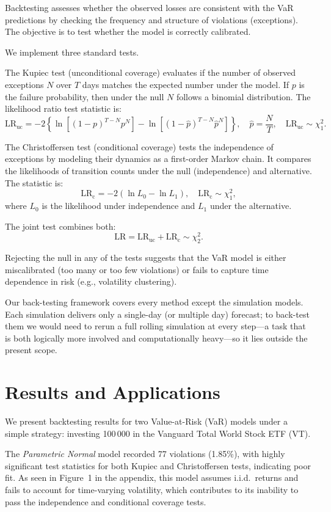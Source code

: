 \documentclass{article}
\begin{document}
Backtesting assesses whether the observed losses are consistent with the VaR predictions by checking the frequency and structure of violations (exceptions). The objective is to test whether the model is correctly calibrated.

We implement three standard tests.

The Kupiec test (unconditional coverage) evaluates if the number of observed exceptions $N$ over $T$ days matches the expected number under the model. If $p$ is the failure probability, then under the null $N$ follows a binomial distribution. The likelihood ratio test statistic is:
\[
\text{LR}_{\text{uc}} = -2 \left\{ \ln\left[(1 - p)^{T - N} p^N \right] - \ln\left[(1 - \hat{p})^{T - N} \hat{p}^N \right] \right\}, \quad \hat{p} = \frac{N}{T}, \quad \text{LR}_{\text{uc}} \sim \chi^2_1.
\]

The Christoffersen test (conditional coverage) tests the independence of exceptions by modeling their dynamics as a first-order Markov chain. It compares the likelihoods of transition counts under the null (independence) and alternative. The statistic is:
\[
\text{LR}_{\text{c}} = -2 (\ln L_0 - \ln L_1), \quad \text{LR}_{\text{c}} \sim \chi^2_1,
\]
where $L_0$ is the likelihood under independence and $L_1$ under the alternative.

The joint test combines both:
\[
\text{LR} = \text{LR}_{\text{uc}} + \text{LR}_{\text{c}} \sim \chi^2_2.
\]

Rejecting the null in any of the tests suggests that the VaR model is either miscalibrated (too many or too few violations) or fails to capture time dependence in risk (e.g., volatility clustering).

Our back-testing framework covers every method except the simulation models. Each simulation delivers only a single-day (or multiple day) forecast; to back-test them we would need to rerun a full rolling simulation at every step—a task that is both logically more involved and computationally heavy—so it lies outside the present scope.


\section{Results and Applications}

We present backtesting results for two Value-at-Risk (VaR) models under a simple strategy: investing 100\,000 in the Vanguard Total World Stock ETF (VT).

The \textit{Parametric Normal} model recorded 77 violations (1.85\%), with highly significant test statistics for both Kupiec and Christoffersen tests, indicating poor fit. As seen in Figure 1 in the appendix, this model assumes i.i.d.\ returns and fails to account for time-varying volatility, which contributes to its inability to pass the independence and conditional coverage tests.
\end{document}
